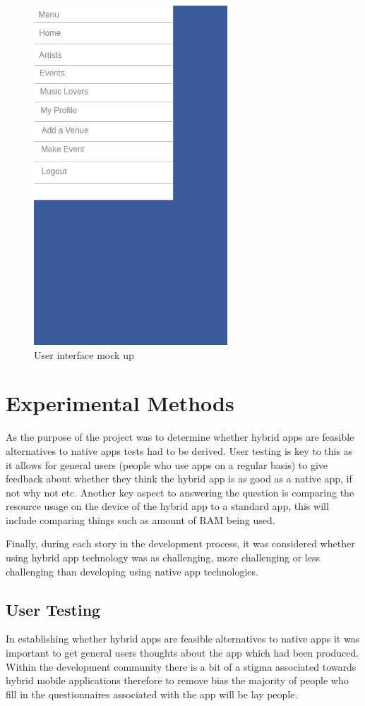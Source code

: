 \begin{figure}[H]
\includegraphics[scale=0.5]{images/ui3}
\caption{User interface mock up}
\end{figure}

\section{Experimental Methods}
As the purpose of the project was to determine whether hybrid apps are feasible alternatives to native apps tests had to be derived. User testing is key to this as it allows for general users (people who use apps on a regular basis) to give feedback about whether they think the hybrid app is as good as a native app, if not why not etc. Another key aspect to answering the question is comparing the resource usage on the device of the hybrid app to a standard app, this will include comparing things such as amount of RAM being used.

Finally, during each story in the development process, it was considered whether using hybrid app technology was as challenging, more challenging or less challenging than developing using native app technologies.

\subsection{User Testing}
In establishing whether hybrid apps are feasible alternatives to native apps it was important to get general users thoughts about the app which had been produced. Within the development community there is a bit of a stigma associated towards hybrid mobile applications therefore to remove bias the majority of people who fill in the questionnaires associated with the app will be lay people.

